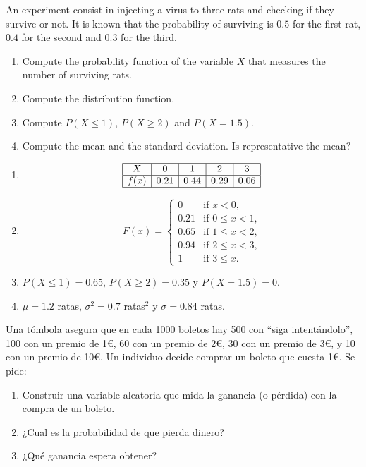 {An experiment consist in injecting a virus to three rats and checking if they survive or not. 
It is known that the probability of surviving is $0.5$ for the first rat, $0.4$ for the second and $0.3$
for the third.
\begin{enumerate}
\item Compute the probability function of the variable $X$ that measures the number of surviving rats.
\item Compute the distribution function.
\item Compute $P(X\leq 1)$, $P(X\geq 2)$ and $P(X=1.5)$.
\item Compute the mean and the standard deviation. 
Is representative the mean?
\end{enumerate}
}
{
\begin{enumerate}
\item \[
\begin{array}{|c|c|c|c|c|}
\hline
X & 0 & 1 & 2 & 3 \\
\hline
f(x) & 0.21 & 0.44 & 0.29 & 0.06\\
\hline
\end{array}
\]
\item \[
F(x)=
\begin{cases}
0 & \text{if $x<0$,}\\
0.21 & \text{if $0\leq x<1$,}\\
0.65 & \text{if $1\leq x<2$,}\\
0.94 & \text{if $2\leq x<3$,}\\
1 & \text{if $3\leq x$.}
\end{cases}
\]
\item $P(X\leq 1)=0.65$, $P(X\geq 2)=0.35$ y $P(X=1.5)=0$.
\item $\mu=1.2$ ratas, $\sigma^2=0.7$ ratas$^2$ y $\sigma=0.84$ ratas.
\end{enumerate}
}
{}


{Una tómbola asegura que en cada 1000 boletos hay 500 con ``siga intentándolo'', 100 con un premio de 1\euro, 60 con un premio de 2\euro, 30 con un premio de 3\euro, y 10 con un premio de 10\euro. Un individuo decide comprar un boleto que cuesta 1\euro. Se pide:

\begin{enumerate}
\item Construir una variable aleatoria que mida la ganancia (o pérdida) con la compra de un boleto.
\item ¿Cual es la probabilidad de que pierda dinero?
\item ¿Qué ganancia espera obtener?
\end{enumerate}
}
{}
{}


